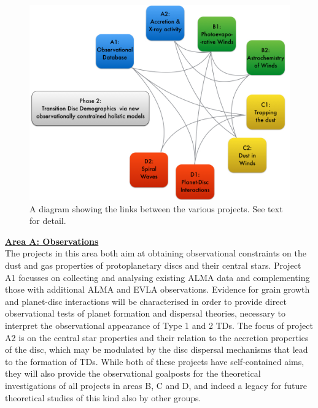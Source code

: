 \documentclass[12pt]{article}
\begin{document}
\begin{figure}
\centerline{\includegraphics[width=13cm]{dependency2.jpg}}
\caption{A diagram showing the links between the various
projects. See text for detail.}

\end{figure}

\vspace{1.0em}


%
\noindent\underline{{\bf Area A: Observations}}\\
\noindent The projects in this area both aim at obtaining
observational constraints on the dust and gas properties of
protoplanetary discs and their central stars. Project A1 focusses on
collecting and analysing existing ALMA data and complementing those
with additional ALMA and EVLA observations. Evidence for grain growth
and planet-disc interactions will be characterised in order to provide
direct observational tests of planet formation and dispersal theories,
necessary to interpret the observational appearance of Type 1 and 2
TDs. The focus of project A2 is on the central star properties and
their relation to the accretion properties of the disc, which may be
modulated by the disc dispersal mechanisms that lead to the formation
of TDs. While both of these projects have self-contained aims, they
will also provide the observational goalposts for the theoretical
investigations of all projects in areas B, C and D, and indeed a
legacy for future theoretical studies of this kind also by other
groups.    \\ 
\end{document}
